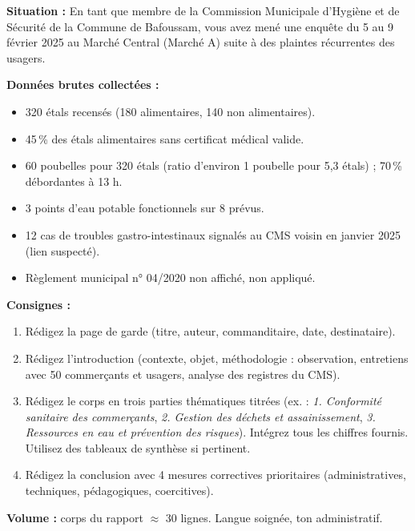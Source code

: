 \documentclass[11pt]{article}
\begin{document}
\begin{exercice}
\textbf{Situation :} En tant que membre de la Commission Municipale d'Hygiène et de Sécurité de la Commune de Bafoussam, vous avez mené une enquête du 5 au 9 février 2025 au Marché Central (Marché A) suite à des plaintes récurrentes des usagers.

\textbf{Données brutes collectées :}
\begin{itemize}
    \item 320 étals recensés (180 alimentaires, 140 non alimentaires).
    \item 45\,\% des étals alimentaires sans certificat médical valide.
    \item 60 poubelles pour 320 étals (ratio d'environ 1 poubelle pour 5,3 étals) ; 70\,\% débordantes à 13 h.
    \item 3 points d'eau potable fonctionnels sur 8 prévus.
    \item 12 cas de troubles gastro-intestinaux signalés au CMS voisin en janvier 2025 (lien suspecté).
    \item Règlement municipal n° 04/2020 non affiché, non appliqué.
\end{itemize}

\textbf{Consignes :}
\begin{enumerate}
    \item Rédigez la page de garde (titre, auteur, commanditaire, date, destinataire).
    \item Rédigez l'introduction (contexte, objet, méthodologie : observation, entretiens avec 50 commerçants et usagers, analyse des registres du CMS).
    \item Rédigez le corps en trois parties thématiques titrées (ex. : \emph{1. Conformité sanitaire des commerçants}, \emph{2. Gestion des déchets et assainissement}, \emph{3. Ressources en eau et prévention des risques}). Intégrez tous les chiffres fournis. Utilisez des tableaux de synthèse si pertinent.
    \item Rédigez la conclusion avec 4 mesures correctives prioritaires (administratives, techniques, pédagogiques, coercitives).
\end{enumerate}
\textbf{Volume :} corps du rapport $\approx$ 30 lignes. Langue soignée, ton administratif.
\end{exercice}
\end{document}
